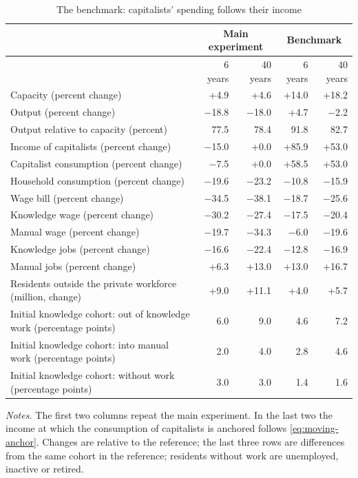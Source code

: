 \begin{table}[htbp]\centering\small
\caption{The benchmark: capitalists' spending follows their income}\label{tab:anchor}
\begin{tabularx}{\linewidth}{@{}>{\raggedright\arraybackslash}Xrrrr@{}}\toprule
 & \multicolumn{2}{c}{Main experiment} & \multicolumn{2}{c}{Benchmark} \\\midrule
 & 6 years & 40 years & 6 years & 40 years \\
Capacity (percent change) & +4.9 & +4.6 & +14.0 & +18.2 \\
Output (percent change) & $-$18.8 & $-$18.0 & +4.7 & $-$2.2 \\
Output relative to capacity (percent) & 77.5 & 78.4 & 91.8 & 82.7 \\
Income of capitalists (percent change) & $-$15.0 & +0.0 & +85.9 & +53.0 \\
Capitalist consumption (percent change) & $-$7.5 & +0.0 & +58.5 & +53.0 \\
Household consumption (percent change) & $-$19.6 & $-$23.2 & $-$10.8 & $-$15.9 \\
Wage bill (percent change) & $-$34.5 & $-$38.1 & $-$18.7 & $-$25.6 \\
Knowledge wage (percent change) & $-$30.2 & $-$27.4 & $-$17.5 & $-$20.4 \\
Manual wage (percent change) & $-$19.7 & $-$34.3 & $-$6.0 & $-$19.6 \\
Knowledge jobs (percent change) & $-$16.6 & $-$22.4 & $-$12.8 & $-$16.9 \\
Manual jobs (percent change) & +6.3 & +13.0 & +13.0 & +16.7 \\
Residents outside the private workforce (million, change) & +9.0 & +11.1 & +4.0 & +5.7 \\
Initial knowledge cohort: out of knowledge work (percentage points) & 6.0 & 9.0 & 4.6 & 7.2 \\
Initial knowledge cohort: into manual work (percentage points) & 2.0 & 4.0 & 2.8 & 4.6 \\
Initial knowledge cohort: without work (percentage points) & 3.0 & 3.0 & 1.4 & 1.6 \\
\bottomrule\end{tabularx}
\par\smallskip\begin{minipage}{\linewidth}\footnotesize\emph{Notes.} The first two columns repeat the main experiment. In the last two the income at which the consumption of capitalists is anchored follows \eqref{eq:moving-anchor}. Changes are relative to the reference; the last three rows are differences from the same cohort in the reference; residents without work are unemployed, inactive or retired.\end{minipage}
\end{table}
